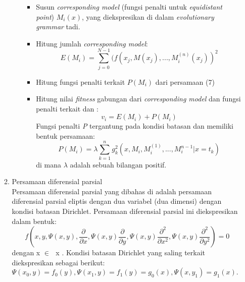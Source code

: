 \begin{enumerate}[1.]
\begin{enumerate}[1.]
\begin{enumerate}[1.]
			\begin{itemize}

				\item Susun \textit{corresponding model} (fungsi penalti untuk \textit{equidistant point}) \textit{\begin{math} M_i(x)\end{math}}, yang diekspresikan di dalam \textit{evolutionary grammar} tadi.
				\item Hitung jumlah \textit{corresponding model}:
					\begin{equation} E(M_i) = \sum_{j=0}^{N-1} (f(x_j, M(x_j),..., M_i^{(n)}(x_j))^{2} \end{equation}
				\item Hitung fungsi penalti terkait \begin{math} P(M_i) \end{math} dari persamaan (7)
				\item Hitung nilai \textit{fitness} gabungan dari \textit{corresponding model} dan fungsi penalti terkait dan : 
					\begin{equation} v_i = E(M_i) + P(M_i) \end{equation}
				Fungsi penalti \textit{P} tergantung pada kondisi batasan dan memiliki bentuk persamaan:
					\begin{equation} P(M_i) = \lambda \sum_{k=1}^{n} g^{2}_k(x, M_i, M_i^{(1)},...,M_i^{n-1}|x=t_k) \end{equation}
					di mana \begin{math}\lambda \end{math} adalah sebuah bilangan positif.
			\end{itemize}

		\end{enumerate}

		\item Persamaan diferensial parsial
		\\
		Persamaan diferensial parsial yang dibahas di adalah persamaan diferensial parsial eliptis dengan dua variabel (dua dimensi) dengan kondisi batasan Dirichlet. Persamaan diferensial parsial ini diekspresikan dalam bentuk:
		\begin{equation} f(x, y, \Psi(x, y), \frac{\partial}{\partial x}, \Psi(x, y) \frac{\partial}{\partial y}, \Psi(x, y) \frac{\partial^{2}}{\partial x^{2}}, \Psi(x, y) \frac{\partial^{2}}{\partial y^{2}}) = 0 \end{equation}
		dengan x \begin{math} \in \end{math} \begin{math}  [x_0, x_1] \end{math} x \begin{math}  [y_0, y_1] \end{math}. Kondisi batasan  Dirichlet  yang saling terkait diekspresikan sebagai berikut: \begin{math} \Psi(x_0, y) = f_0(y), \Psi(x_1, y) = f_1(y) = g_0(x), 			\Psi(x, y_1) = g_1(x). \end{math}


\end{enumerate}
\end{enumerate}
